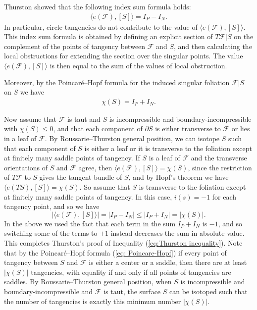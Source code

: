 \documentclass[11pt]{amsart}
\theoremstyle{remark}
\theoremstyle{definition}
\begin{document}
	Thurston showed that the following index sum formula holds: 
	\begin{align}
		\langle e(\mathcal{F}) , [S] \rangle = I_P - I_N.
	\end{align}
	In particular, circle tangencies do not contribute to the value of $\langle e(\mathcal{F}) , [S] \rangle$. This index sum formula is obtained by defining an explicit section of $T\mathcal{F} |S$ on the complement of the points of tangency between $\mathcal{F}$ and $S$, and then calculating the local obstructions for extending the section over the singular points. The value $\langle e(\mathcal{F}) , [S] \rangle$ is then equal to the sum of the values of local obstruction. 
	
	Moreover, by the Poincar\'{e}--Hopf formula for the induced singular foliation $\mathcal{F}|S$ on $S$ we have 
	\begin{align}
		\chi(S) = I_P + I_N.
		\label{eq: Poincare-Hopf}
	\end{align}

	Now assume that $\mathcal{F}$ is taut and $S$ is incompressible and boundary-incompressible with $\chi(S) \leq 0$, and that each component of $\partial S$ is either transverse to $\mathcal{F}$ or lies in a leaf of $\mathcal{F}$. By Roussarie--Thurston general position, we can isotope $S$ such that each component of $S$ is either a leaf or it is transverse to the foliation except at finitely many saddle points of tangency. If $S$ is a leaf of $\mathcal{F}$ and the transverse orientations of $S$ and $\mathcal{F}$ agree, then $\langle e(\mathcal{F}) , [S] \rangle = \chi(S)$, since the restriction of $T \mathcal{F}$ to $S$ gives the tangent bundle of $S$, and by Hopf's theorem we have $\langle e(TS), [S] \rangle = \chi(S)$. So assume that $S$ is transverse to the foliation except at finitely many saddle points of tangency. In this case, $i(s)=-1$ for each tangency point, and so we have 
	\[ |\langle e(\mathcal{F}) , [S] \rangle | = |I_P- I_N| \leq |I_P + I_N| = |\chi(S)|. \]
	In the above we used the fact that each term in the sum $I_P + I_N$ is $-1$, and so switching some of the terms to $+1$ instead decreases the sum in absolute value. This completes Thurston's proof of Inequality (\ref{eq:Thurston inequality}). Note that by the Poincar\'{e}--Hopf formula (\ref{eq: Poincare-Hopf}) if every point of tangency between $S$ and $\mathcal{F}$ is either a center or a saddle, then there are at least $|\chi(S)|$ tangencies, with equality if and only if all points of tangencies are saddles. By Roussarie--Thurston general position, when $S$ is incompressible and boundary-incompressible and $\mathcal{F}$ is taut, the surface $S$ can be isotoped such that the number of tangencies is exactly this minimum number $|\chi(S)|$. 
	
\end{document}
